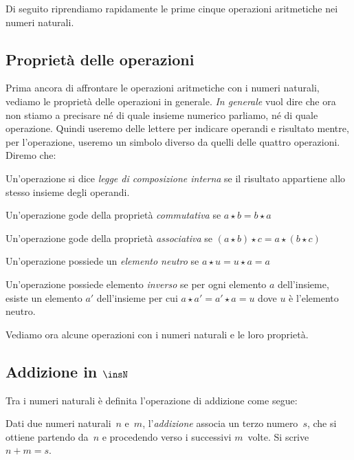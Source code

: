 Di seguito riprendiamo rapidamente le prime cinque operazioni aritmetiche 
nei numeri naturali. 

\subsection{Proprietà delle operazioni}

Prima ancora di affrontare le operazioni aritmetiche con i numeri naturali, 
vediamo le proprietà delle operazioni in generale. \emph{In generale} vuol 
dire che ora non stiamo a precisare né di quale insieme numerico parliamo, 
né di quale operazione. Quindi useremo delle lettere per indicare  
operandi e  risultato mentre, per l'operazione, useremo un simbolo diverso 
da quelli delle quattro operazioni. Diremo che:

\begin{itemize*}
 \item Un'operazione si dice \emph{legge di composizione interna} se
  il risultato appartiene allo stesso insieme degli operandi.
 \item Un'operazione gode della proprietà \emph{commutativa} se 
  \(a \star b = b \star a\)
 \item Un'operazione gode della proprietà \emph{associativa} se 
  \((a \star b) \star c = a \star (b \star c)\)
 \item Un'operazione possiede un \emph{elemento neutro} se 
  \(a \star u = u \star a = a\)
 \item Un'operazione possiede elemento \emph{inverso} se per ogni
  elemento \(a\) dell'insieme, esiste un elemento \(a'\) 
  dell'insieme per cui \(a \star a' = a' \star a = u\) dove \(u\) è l'elemento
  neutro.
\end{itemize*}

Vediamo ora alcune operazioni con i numeri naturali e le loro proprietà.

\subsection{Addizione in \(\insN\)}

Tra i numeri naturali è definita l'operazione di addizione come segue:

\begin{definizione}
  Dati due numeri naturali~\(n\) e~\(m\), l'\emph{addizione} associa un terzo 
  numero~\(s\), che si ottiene partendo da~\(n\) e procedendo verso i 
  successivi \(m\)~volte. Si scrive~\(n+m=s\).
\end{definizione}

